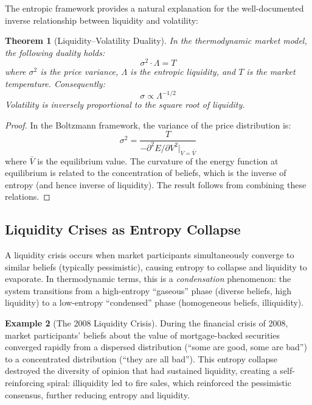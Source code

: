 \documentclass[12pt,a4paper]{article}
\newtheorem{theorem}{Theorem}[section]
\theoremstyle{definition}
\newtheorem{example}[theorem]{Example}
\begin{document}
The entropic framework provides a natural explanation for the well-documented inverse relationship between liquidity and volatility:

\begin{theorem}[Liquidity--Volatility Duality]\label{thm:liq_vol}
In the thermodynamic market model, the following duality holds:
\begin{equation}\label{eq:liq_vol_duality}
    \sigma^2 \cdot \Lambda = T
\end{equation}
where $\sigma^2$ is the price variance, $\Lambda$ is the entropic liquidity, and $T$ is the market temperature. Consequently:
\begin{equation}
    \sigma \propto \Lambda^{-1/2}
\end{equation}
Volatility is inversely proportional to the square root of liquidity.
\end{theorem}

\begin{proof}
In the Boltzmann framework, the variance of the price distribution is:
\begin{equation}
    \sigma^2 = \frac{T}{-\partial^2 E / \partial V^2 \big|_{V=\bar{V}}}
\end{equation}
where $\bar{V}$ is the equilibrium value. The curvature of the energy function at equilibrium is related to the concentration of beliefs, which is the inverse of entropy (and hence inverse of liquidity). The result follows from combining these relations.
\end{proof}

\subsection{Liquidity Crises as Entropy Collapse}

A liquidity crisis occurs when market participants simultaneously converge to similar beliefs (typically pessimistic), causing entropy to collapse and liquidity to evaporate. In thermodynamic terms, this is a \emph{condensation} phenomenon: the system transitions from a high-entropy ``gaseous'' phase (diverse beliefs, high liquidity) to a low-entropy ``condensed'' phase (homogeneous beliefs, illiquidity).

\begin{example}[The 2008 Liquidity Crisis]
During the financial crisis of 2008, market participants' beliefs about the value of mortgage-backed securities converged rapidly from a dispersed distribution (``some are good, some are bad'') to a concentrated distribution (``they are all bad''). This entropy collapse destroyed the diversity of opinion that had sustained liquidity, creating a self-reinforcing spiral: illiquidity led to fire sales, which reinforced the pessimistic consensus, further reducing entropy and liquidity.
\end{example}
\end{document}
